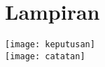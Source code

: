 \documentclass[./../SKRIPSI_ALDZIKRI_DWIJAYANTO_PRATHAMA.tex]{subfiles}
\begin{document}
\chapter*{Lampiran}
\texttt{[image: keputusan]}\\[3ex]
\texttt{[image: catatan]}
\end{document}
